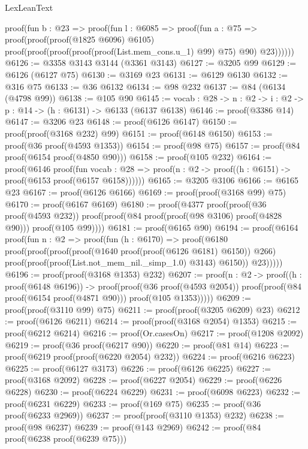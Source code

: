 \begin{lexlean}{LexLeanText}
\begin{coremodule}
    proof(fun {b : @23} =>
      proof(fun {l : @6085} =>
        proof(fun {a : @75} =>
          proof(proof(proof(@1825 @6096) @6105)
              proof(proof(proof(proof(proof(List.mem_cons.{u_1}) @99) @75) @90) @23))))))
@6126 := @3358 @3143 @3144 (@3361 @3143)
@6127 := @3205 @99
@6129 := @6126 (@6127 @75)
@6130 := @3169 @23
@6131 := @6129 @6130
@6132 := @316 @75
@6133 := @36 @6132
@6134 := @98 @232
@6137 := @84 (@6134 (@4798 @99))
@6138 := @105 @90
@6145 := {vocab : @28} -> {n : @2} -> {i : @2} -> {p : @14} -> (h : @6131) -> @6133 (@6137 @6138)
@6146 := proof(@3386 @14)
@6147 := @3206 @23
@6148 := proof(@6126 @6147)
@6150 := proof(proof(@3168 @232) @99)
@6151 := proof(@6148 @6150)
@6153 := proof(@36 proof(@4593 @1353))
@6154 := proof(@98 @75)
@6157 := proof(@84 proof(@6154 proof(@4850 @90)))
@6158 := proof(@105 @232)
@6164 := proof(@6146
      proof(fun {vocab : @28} =>
        proof({n : @2} -> proof((h : @6151) -> proof(@6153 proof(@6157 @6158))))))
@6165 := @3205 @3106
@6166 := @6165 @23
@6167 := proof(@6126 @6166)
@6169 := proof(proof(@3168 @99) @75)
@6170 := proof(@6167 @6169)
@6180 := proof(@4377
      proof(proof(@36 proof(@4593 @232))
          proof(proof(@84 proof(proof(@98 @3106) proof(@4828 @90))) proof(@105 @99))))
@6181 := proof(@6165 @90)
@6194 := proof(@6164
      proof(fun {n : @2} =>
        proof(fun (h : @6170) =>
          proof(@6180
              proof(proof(proof(proof(@1640 proof(proof(@6126 @6181) @6150)) @266)
                    proof(proof(proof(List.not_mem_nil._simp_1.{0}) @3143) @6150))
                  @23)))))
@6196 := proof(proof(@3168 @1353) @232)
@6207 := proof({n : @2} ->
    proof((h : proof(@6148 @6196)) ->
      proof(proof(@36 proof(@4593 @2054))
          proof(proof(@84 proof(@6154 proof(@4871 @90))) proof(@105 @1353)))))
@6209 := proof(proof(@3110 @99) @75)
@6211 := proof(proof(@3205 @6209) @23)
@6212 := proof(@6126 @6211)
@6214 := proof(proof(@3168 @2054) @1353)
@6215 := proof(@6212 @6214)
@6216 := proof(Or.casesOn)
@6217 := proof(@1208 @2092)
@6219 := proof(@36 proof(@6217 @90))
@6220 := proof(@81 @14)
@6223 := proof(@6219 proof(proof(@6220 @2054) @232))
@6224 := proof(@6216 @6223)
@6225 := proof(@6127 @3173)
@6226 := proof(@6126 @6225)
@6227 := proof(@3168 @2092)
@6228 := proof(@6227 @2054)
@6229 := proof(@6226 @6228)
@6230 := proof(@6224 @6229)
@6231 := proof(@6098 @6223)
@6232 := proof(@6231 @6229)
@6233 := proof(@169 @75)
@6235 := proof(@36 proof(@6233 @2969))
@6237 := proof(proof(@3110 @1353) @232)
@6238 := proof(@98 @6237)
@6239 := proof(@143 @2969)
@6242 := proof(@84 proof(@6238 proof(@6239 @75)))

\end{coremodule}
\end{lexlean}
